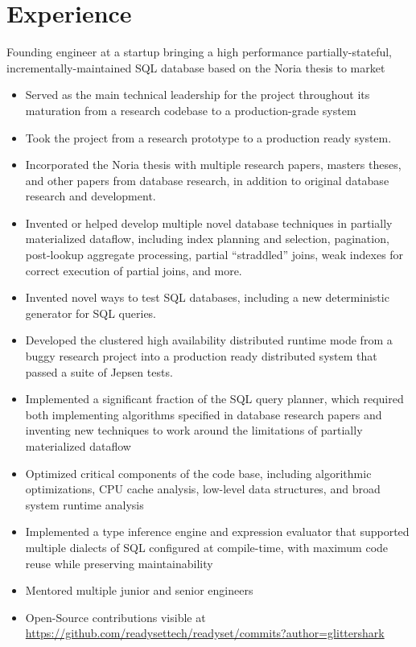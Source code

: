 \documentclass[10pt,a4paper,sans]{moderncv}        %
\begin{document}
\section{Experience}
{Founding engineer at a startup bringing a high performance
  partially-stateful, incrementally-maintained SQL database based on the Noria
  thesis to market
  \begin{itemize}
    \item Served as the main technical leadership for the project throughout its
          maturation from a research codebase to a production-grade system
    \item Took the project from a research prototype to a production ready
          system.
    \item Incorporated the Noria thesis with multiple research papers,
          masters theses, and other papers from database research, in addition to
          original database research and development.
    \item Invented or helped develop multiple novel database techniques in
          partially materialized dataflow, including index planning and
          selection, pagination, post-lookup aggregate processing, partial
          ``straddled'' joins, weak indexes for correct execution of partial
          joins, and more.
    \item Invented novel ways to test SQL databases, including a new deterministic
          generator for SQL queries.
    \item Developed the clustered high availability distributed runtime mode from
          a buggy research project into a production ready distributed system
          that passed a suite of Jepsen tests.
    \item Implemented a significant fraction of the SQL query planner, which
          required both implementing algorithms specified in database research
          papers and inventing new techniques to work around the limitations of
          partially materialized dataflow
    \item Optimized critical components of the code base, including algorithmic
          optimizations, CPU cache analysis, low-level data structures, and
          broad system runtime analysis
    \item Implemented a type inference engine and expression evaluator that
          supported multiple dialects of SQL configured at compile-time, with
          maximum code reuse while preserving maintainability
    \item Mentored multiple junior and senior engineers
    \item Open-Source contributions visible at
          \url{https://github.com/readysettech/readyset/commits?author=glittershark}
  \end{itemize}}
\end{document}
